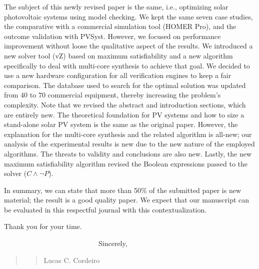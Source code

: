 \documentclass[11pt]{article}
\newcommand\vi{\vspace{\baselineskip}}
\begin{document}
The subject of this newly revised paper is the same, i.e., optimizing solar photovoltaic systems using model checking. We kept the same seven case studies, the comparative with a commercial simulation tool (HOMER Pro), and the outcome validation with PVSyst. However, we focused on performance improvement without loose the qualitative aspect of the results. We introduced a new solver tool (vZ) based on maximum satisfiability and a new algorithm specifically to deal with multi-core synthesis to achieve that goal. We decided to use a new hardware configuration for all verification engines to keep a fair comparison. The database used to search for the optimal solution was updated from $40$ to $70$ commercial equipment, thereby increasing the problem's complexity. Note that we revised the abstract and introduction sections, which are entirely new. The theoretical foundation for PV systems and how to size a stand-alone solar PV system is the same as the original paper. However, the explanation for the multi-core synthesis and the related algorithm is all-new; our analysis of the experimental results is new due to the new nature of the employed algorithms. The threats to validity and conclusions are also new. 
Lastly, the new maximum satisfiability algorithm revised the Boolean expressions passed to the solver ($C \wedge \neg P$). 

In summary, we can state that more than 50\% of the submitted paper is new material; the result is a good quality paper. We expect that our manuscript can be evaluated in this respectful journal with this contextualization.


\vi
Thank you for your time.
\vi


\indent
~~~~~~~~~~~~~~~~~~~~~~~~~~~Sincerely,\\



\begin{quote}
\begin{quote}
\begin{flushright}



Lucas C. Cordeiro~~~~~~~
\end{flushright}
\end{quote}
\end{quote}


 
 
\end{document}
